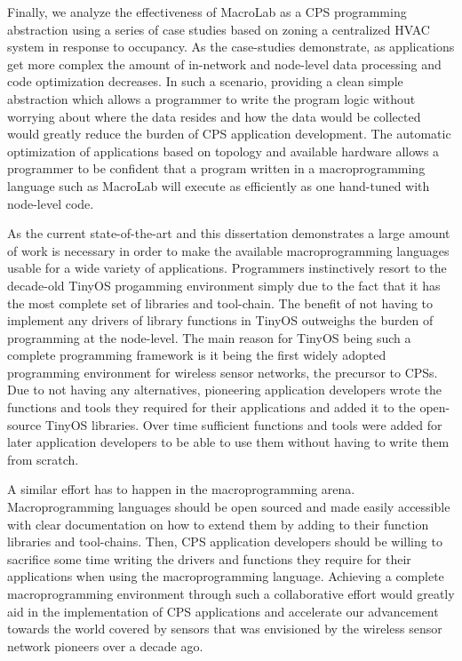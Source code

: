 Finally, we analyze the effectiveness of MacroLab as a CPS programming
abstraction using a series of case studies based on zoning a centralized HVAC
system in response to occupancy. As the case-studies demonstrate, as
applications get more complex the amount of in-network and node-level data
processing and code optimization decreases. In such a scenario, providing a
clean simple abstraction which allows a programmer to write the program logic
without worrying about where the data resides and how the data would be
collected would greatly reduce the burden of CPS application development. The
automatic optimization of applications based on topology and available hardware
allows a programmer to be confident that a program written in a macroprogramming
language such as MacroLab will execute as efficiently as one hand-tuned with
node-level code. 

As the current state-of-the-art and this dissertation demonstrates a large
amount of work is necessary in order to make the available macroprogramming
languages usable for a wide variety of applications. Programmers instinctively
resort to the decade-old TinyOS progamming environment simply due to the fact
that it has the most complete set of libraries and tool-chain. The benefit of not
having to implement any drivers of library functions in TinyOS outweighs the
burden of programming at the node-level. The main reason for TinyOS being such a
complete programming framework is it being the first widely adopted programming
environment for wireless sensor networks, the precursor to CPSs. Due to not
having any alternatives, pioneering application developers wrote the functions
and tools they required for their applications and added it to the open-source
TinyOS libraries. Over time sufficient functions and tools were added for later
application developers to be able to use them without having to write them from
scratch. 

A similar effort has to happen in the macroprogramming arena. Macroprogramming
languages should be open sourced and made easily accessible with clear
documentation on how to extend them by adding to their function libraries and
tool-chains. Then, CPS application developers should be willing to sacrifice
some time writing the drivers and functions they require for their applications
when using the macroprogramming language. Achieving a complete macroprogramming
environment through such a collaborative effort would greatly aid in the
implementation of CPS applications and accelerate our advancement towards the
world covered by sensors that was envisioned by the wireless sensor network
pioneers over a decade ago. 
